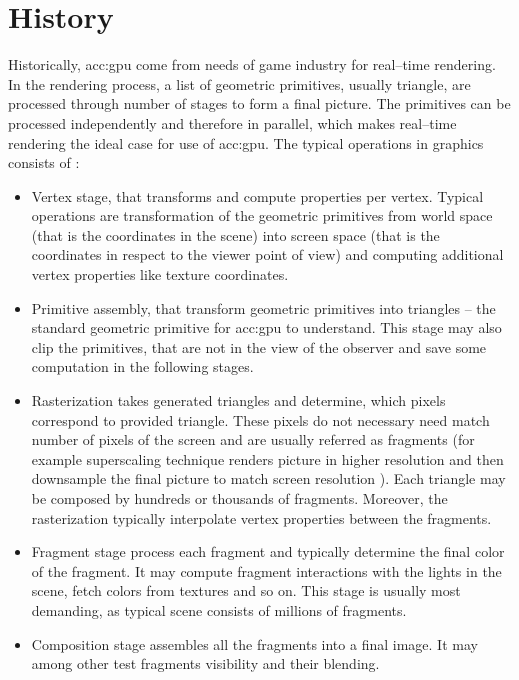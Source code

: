 \section{History}

Historically, \acrshort{acc:gpu} come from needs of game industry for real--time rendering. In the rendering process, a list of geometric primitives, usually triangle, are processed through number of stages to form a final picture. The primitives can be processed independently and therefore in parallel, which makes real--time rendering the ideal case for use of \acrshort{acc:gpu}. The typical operations in graphics consists of \citep{GPUComputingOwens}:
\begin{itemize}
    \item Vertex stage, that transforms and compute properties per vertex. Typical operations are transformation of the geometric primitives from world space (that is the coordinates in the scene) into screen space (that is the coordinates in respect to the viewer point of view) and computing additional vertex properties like texture coordinates.
    \item Primitive assembly, that transform geometric primitives into triangles -- the standard geometric primitive for \acrshort{acc:gpu} to understand. This stage may also clip the primitives, that are not in the view of the observer and save some computation in the following stages.
    \item Rasterization takes generated triangles and determine, which pixels correspond to provided triangle. These pixels do not necessary need match number of pixels of the screen and are usually referred as fragments (for example superscaling technique renders picture in higher resolution and then downsample the final picture to match screen resolution \citep{GameGraphicProgramming}). Each triangle may be composed by hundreds or thousands of fragments. Moreover, the rasterization typically interpolate vertex properties between the fragments.
    \item Fragment stage process each fragment and typically determine the final color of the fragment. It may compute fragment interactions with the lights in the scene, fetch colors from textures and so on. This stage is usually most demanding, as typical scene consists of millions of fragments.
    \item Composition stage assembles all the fragments into a final image. It may among other test fragments visibility and their blending.
\end{itemize}

